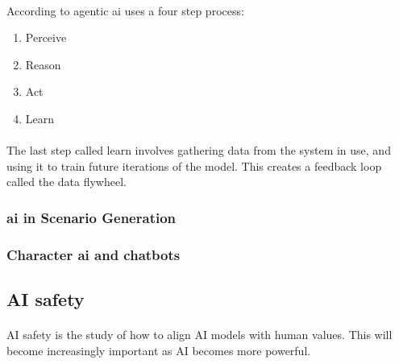 \paragraph{}According to \textcite{pounds_what_2024} agentic \acrshort{ai} uses a four step process:
\begin{enumerate}
    \item Perceive
    \item Reason
    \item Act
    \item Learn
\end{enumerate}

\paragraph{}The last step called learn involves gathering data from the system in use, and using it to train future iterations of the model. This creates a feedback loop called the data flywheel.


\subsubsection{\acrshort{ai} in Scenario Generation}

\subsubsection{Character \acrshort{ai} and chatbots}

\subsection{AI safety}
\paragraph{}AI safety is the study of how to align AI models with human values. This will become increasingly important as AI becomes more powerful.

\paragraph{}